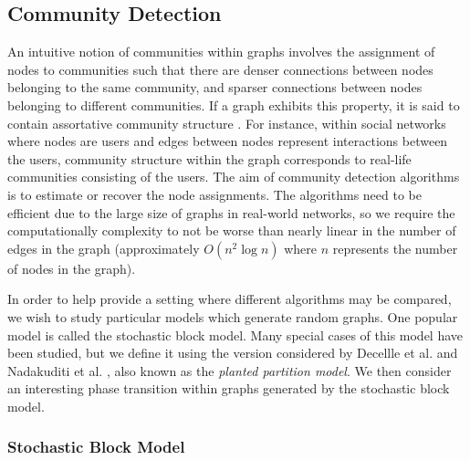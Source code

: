 \documentclass[12pt]{article}
\numberwithin{equation}{section}
\begin{document}
\subsection{Community Detection}
\label{subsec:communityDetection}

An intuitive notion of communities within graphs involves the assignment of nodes to communities such that there are denser connections between nodes belonging to the same community, and sparser connections between nodes belonging to different communities. If a graph exhibits this property, it is said to contain assortative community structure \cite{New06a,DKM+13,For10,New06b}. For instance, within social networks where nodes are users and edges between nodes represent interactions between the users, community structure within the graph corresponds to real-life communities consisting of the users. The aim of community detection algorithms is to estimate or recover the node assignments. The algorithms need to be efficient due to the large size of graphs in real-world networks, so we require the computationally complexity to not be worse than nearly linear in the number of edges in the graph (approximately $O(n^{2}\log n)$ where $n$ represents the number of nodes in the graph).

In order to help provide a setting where different algorithms may be compared, we wish to study particular models which generate random graphs. One popular model is called the stochastic block model. Many special cases of this model have been studied, but we define it using the version considered by Decellle et al. \cite{DKM+13} and Nadakuditi et al. \cite{NN12}, also known as the \textit{planted partition model}. We then consider an interesting phase transition within graphs generated by the stochastic block model.

\subsubsection{Stochastic Block Model}
\label{subsubsec:stochasticBlockModel}
\end{document}
